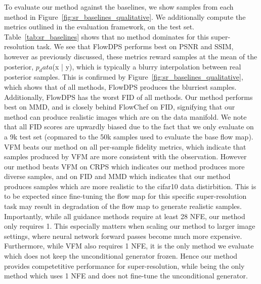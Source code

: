 \documentclass[12pt,a4paper]{report}
\begin{document}
To evaluate our method against the baselines, we show samples from each method in Figure~\ref{fig:sr_baselines_qualitative}. 
We additionally compute the metrics outlined in the evaluation framework, on the test set. 
Table~\ref{tab:sr_baselines} shows that no method dominates for this super-resolution task. 
We see that FlowDPS performs best on PSNR and SSIM, however as previously discussed, these metrics reward samples at the mean of the posterior, $p_data$(x | y), which is typically a blurry interpolation between real posterior samples. This is confirmed by Figure~\ref{fig:sr_baselines_qualitative}, which shows that of all methods, FlowDPS produces the blurriest samples. Additionally, FlowDPS has the worst FID of all methods. 
Our method performs best on MMD, and is closely behind FlowChef on FID, signifying that our method can produce realistic images which are on the data manifold. 
We note that all FID scores are upwardly biased due to the fact that we only evaluate on a 9k test set (copmared to the 50k samples used to evaluate the base flow map). 
VFM beats our method on all per-sample fidelity metrics, which indicate that samples produced by VFM are more consistent with the observation. 
However our method beats VFM on CRPS which indicates our method produces more diverse samples, and on FID and MMD which indicates that our method produces samples which are more realistic to the cifar10 data distirbition. 
This is to be expected since fine-tuning the flow map for this specific super-resolution task may result in degradation of the flow map to generate realistic samples.
Importantly, while all guidance methods require at least 28 NFE, our method only requires 1. This especially matters when scaling our method to larger image settings, where neural network forward passes become much more expensive. Furthermore, while VFM also requires 1 NFE, it is the only method we evaluate which does not keep the unconditional generator frozen. Hence our method provides competetitive performance for super-resolution, while being the only method which uses 1 NFE and does not fine-tune the unconditional generator.  
\end{document}

